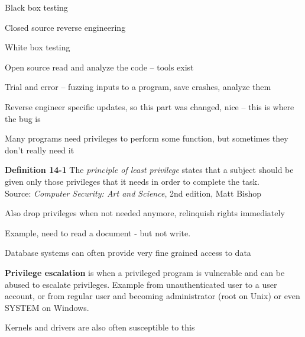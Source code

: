\documentclass[Screen16to9,17pt]{foils}
\begin{document}

\begin{list1}
\item Black box testing
\item Closed source reverse engineering
\item White box testing
\item Open source read and analyze the code -- tools exist
\item Trial and error -- fuzzing inputs to a program, save crashes, analyze them
\item Reverse engineer specific updates, so this part was changed, nice -- this is where the bug is
\end{list1}



\begin{list1}
\item Many programs need privileges to perform some function, but sometimes they don't really need it
\item {\bf Definition 14-1} The \emph{principle of least privilege} states that a subject should be given only those privileges that it needs in order to complete the task.\\
Source:  \emph{Computer Security: Art and Science}, 2nd edition, Matt Bishop

\item Also drop privileges when not needed anymore, relinquish rights immediately
\item Example, need to read a document - but not write.
\item Database systems can often provide very fine grained access to data
\end{list1}

\begin{list1}
\item {\bfseries Privilege escalation} is when a privileged program is vulnerable and can be abused to escalate privileges. Example from unauthenticated user to a user account, or from regular user and becoming administrator (root on Unix) or even SYSTEM on Windows.
\item Kernels and drivers are also often susceptible to this
\end{list1}

\end{document}
